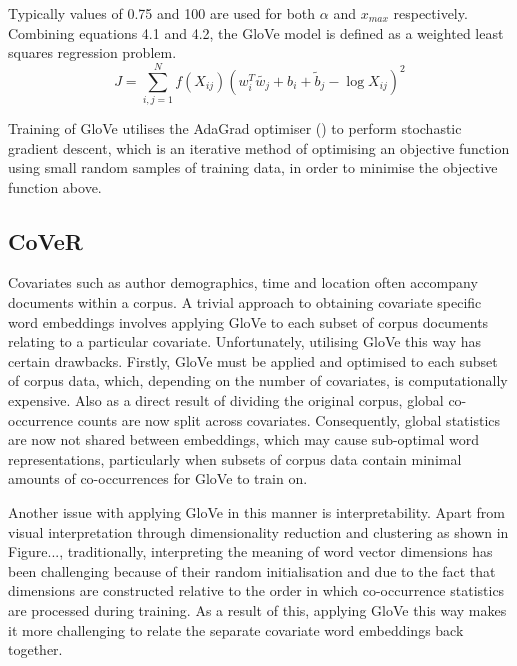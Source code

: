 \noindent
\newline
Typically values of 0.75 and 100 are used for both \( \alpha \) and \(x_{max}\) respectively. Combining equations 4.1 and 4.2, the GloVe model is defined as a weighted least squares regression problem.
\begin{equation}
	J = \sum_{i, j=1}^{N} f(X_{ij}) (w_{i}^{T} \tilde{w_{j}} + b_{i} + \tilde{b}_{j} - \log{X_{ij}})^{2}
\end{equation}

\noindent
\newline
Training of GloVe utilises the AdaGrad optimiser (\cite{Duchi2011}) to perform stochastic gradient descent, which is an iterative method of optimising an objective function using small random samples of training data, in order to minimise the objective function above.

\noindent
\newline
\newline
\subsection{CoVeR}
Covariates such as author demographics, time and location often accompany documents within a corpus. A trivial approach to obtaining covariate specific word embeddings involves applying GloVe to each subset of corpus documents relating to a particular covariate. Unfortunately, utilising GloVe this way has certain drawbacks. Firstly, GloVe must be applied and optimised to each subset of corpus data, which, depending on the number of covariates, is computationally expensive. Also as a direct result of dividing the original corpus, global co-occurrence counts are now split across covariates. Consequently, global statistics are now not shared between embeddings, which may cause sub-optimal word representations, particularly when subsets of corpus data contain minimal amounts of co-occurrences for GloVe to train on. 

\noindent
\newline
Another issue with applying GloVe in this manner is interpretability. Apart from visual interpretation through dimensionality reduction and clustering as shown in Figure..., traditionally, interpreting the meaning of word vector dimensions has been challenging because of their random initialisation and due to the fact that dimensions are constructed relative to the order in which co-occurrence statistics are processed during training. As a result of this, applying GloVe this way makes it more challenging to relate the separate covariate word embeddings back together.


